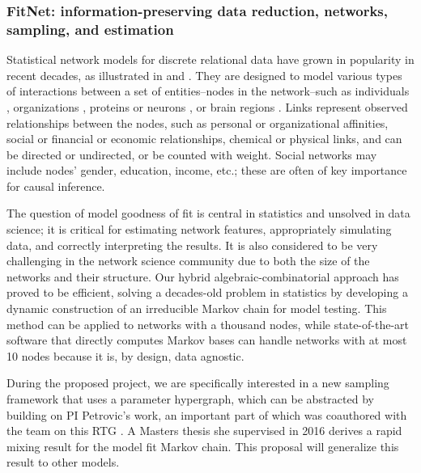 \documentclass[11pt]{NSFamsart}
\begin{document}
\subsubsection*{FitNet: information-preserving data reduction,  networks, sampling, and estimation} 
 Statistical network models for discrete relational data  have grown in popularity in recent decades, as illustrated in \cite{goldenberg2010survey}  and \cite{KolaczykBook2017}. They are designed to model various types of interactions between a set of entities--nodes in the network--such as  individuals \cite{JiJinAuthorsAOAS}, organizations \cite{petrovic2019}, proteins or neurons \cite{GPS21+}, or brain regions \cite{karwa2016exact}. Links represent observed relationships between the nodes, such as personal or organizational affinities, social or financial or economic relationships, chemical or physical links, and can be directed or undirected, or be counted with  weight. Social networks may include nodes’ gender, education, income, etc.; these   are often of key importance for causal inference. 

The question of model goodness of fit is central in statistics and unsolved in data science; it is critical for   estimating network features, appropriately simulating data,  and correctly interpreting the results.  %
It is also considered to be very challenging in the network science community due to both the size of the networks and their structure. Our  hybrid algebraic-combinatorial approach  \cite{GPS16} has proved to be efficient, solving a decades-old problem in statistics by developing a dynamic construction of  an irreducible Markov chain for model testing. This method can be applied to networks with a thousand nodes, while state-of-the-art software \cite{4ti2} that directly computes Markov bases can handle networks with at most 10 nodes because it is, by design, data agnostic. 

During the proposed project, we  are specifically interested in a new sampling framework that uses a parameter hypergraph, which can be abstracted by building on PI Petrovic’s work, an important  part of which was coauthored with the team on this RTG \cite{shellERGM,betaHypergraphs,tergms,bouquetAlgebra,KarwaPetrovic:AOASauthors,Psurvey,PTVhypergraphs,RPF:11}.  A Masters thesis she supervised in 2016 \cite{DillonMS16} derives a rapid mixing result for the model fit Markov chain. This proposal will generalize this result to other models. %
\end{document}
